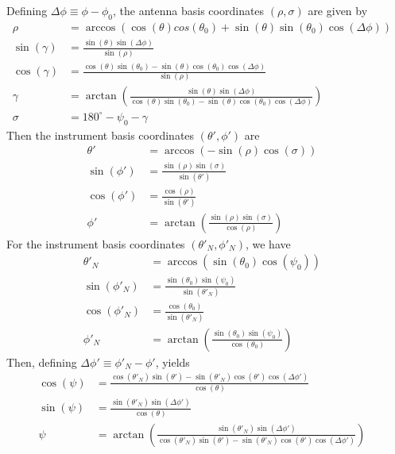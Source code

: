 \documentclass[a4paper,11pt]{article}
\begin{document}
Defining $\Delta \phi \equiv \phi - \phi_0$, the antenna basis coordinates $(\rho,\sigma)$ are given by
%
\begin{align}
\rho  &= \arccos( \cos(\theta) cos(\theta_0) + \sin(\theta) \sin(\theta_0) \cos(\Delta \phi) ) \nonumber & \\
\sin(\gamma) &= \frac{\sin(\theta) \sin(\Delta \phi)}{\sin(\rho)} \nonumber & \\
\cos(\gamma) &= \frac{\cos(\theta) \sin(\theta_0) - \sin(\theta) \cos(\theta_0) \cos(\Delta \phi)}{\sin(\rho)} & \\ 
\gamma       &=  \arctan \left(\frac{\sin(\theta) \sin(\Delta \phi)}{\cos(\theta) \sin(\theta_0) - \sin(\theta) \cos(\theta_0) \cos(\Delta \phi)} \right) \nonumber & \\
\sigma &= 180^{\circ} - \psi_0 - \gamma \nonumber &
\end{align}
%
Then the instrument basis coordinates $(\theta', \phi')$ are
%
\begin{align}
\theta' &= \arccos(-\sin(\rho) \cos(\sigma)) \nonumber & \\
\sin(\phi') &= \frac{\sin(\rho) \sin(\sigma)}{\sin(\theta')} \nonumber & \\
\cos(\phi') &= \frac{\cos(\rho)}{\sin(\theta')} & \\
\phi'       &= \arctan \left( \frac{\sin(\rho) \sin(\sigma)}{\cos(\rho)} \right) \nonumber &
\end{align}
%
For the instrument basis coordinates $(\theta'_N,\phi'_N)$, we have
%
\begin{align}
\theta'_N    &= \arccos(\sin(\theta_0) \cos(\psi_0)) \nonumber & \\
\sin(\phi'_N) &= \frac{\sin(\theta_0)  \sin(\psi_0)}{\sin(\theta'_N)} \nonumber & \\
\cos(\phi'_N) &= \frac{\cos(\theta_0)}{\sin(\theta'_N)} & \\ 
\phi'_N       &= \arctan\left( \frac{\sin(\theta_0)  \sin(\psi_0)}{\cos(\theta_0)} \right) \nonumber &
\end{align}
%
Then, defining $\Delta \phi' \equiv \phi'_N - \phi'$, yields
%
\begin{align}
\cos(\psi) &= \frac{\cos(\theta'_N) \sin(\theta') - \sin(\theta'_N) \cos(\theta') \cos(\Delta \phi')}{\cos(\theta)}  \nonumber & \\
\sin(\psi) &= \frac{\sin(\theta'_N) \sin(\Delta \phi')}{\cos(\theta)}  & \\
\psi       &= \arctan\left( \frac{\sin(\theta'_N) \sin(\Delta \phi')}{\cos(\theta'_N) \sin(\theta') - \sin(\theta'_N) \cos(\theta') \cos(\Delta \phi')} \right)  \nonumber &
\end{align}
\end{document}
